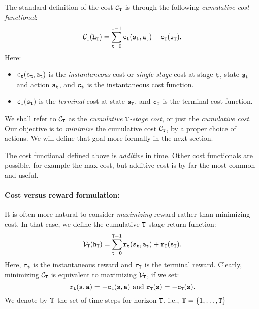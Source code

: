 The standard definition of the cost ${\mathcal{C}_{\tt T}}$ is through
the following \emph{cumulative cost functional}:
\[{\mathcal{C}_{\tt T}}({{\tt h}_{\tt T}}) = \sum_{{\tt t} = 0}^{{\tt T} - 1} {{{\tt c}_{{\tt t}}}({{\tt s}_{{\tt t}}},{{\tt a}_{{\tt t}}}) + {{\tt c}_{\tt T}}({{\tt s}_{\tt T}})}. \]
Here:
    \begin{itemize}
    \item
${{\tt c}_{{\tt t}}}({{\tt s}_{{\tt t}}},{{\tt a}_{{\tt t}}})$ is the
\emph{instantaneous}  cost or \emph{single-stage }cost at stage
${\tt t}$, state ${\tt s}_{\tt t}$ and action ${\tt a}_{\tt t}$, and ${{\tt c}_{{\tt t}}}$ is the instantaneous cost function.
    \item
${{\tt c}_{\tt T}}({{\tt s}_{\tt T}})$ is the \emph{terminal} cost at state ${\tt s}_{\tt T}$,
and ${{\tt c}_{\tt T}}$ is the terminal cost function.
  \end{itemize}


We shall refer to ${\mathcal{C}_{\tt T}}$ as the \emph{cumulative ${\tt T}$-stage cost}, or just the \emph{cumulative cost}.
Our objective is to \emph{minimize} the cumulative cost
${\mathcal{C}_{\tt T}}$, by a proper choice of actions. We will define
that goal more formally in the next section.

\begin{remark}
    The cost functional defined above is \emph{additive} in time. Other cost functionals are possible, for example the max cost, but additive cost is by far the most common and useful.
\end{remark}


\paragraph{Cost versus reward formulation: }
It is often more natural to consider \emph{maximizing} reward rather
than minimizing cost.  In that case, we define the cumulative
${\tt T}$-stage return function:
$${\mathcal{V}_{\tt T}}({{\tt h}_{\tt T}}) = \sum_{{\tt t} = 0}^{{\tt T} - 1} {{{\tt r}_{{\tt t}}}({{\tt s}_{{\tt t}}},{{\tt a}_{{\tt t}}}) + {{\tt r}_{\tt T}}({{\tt s}_{\tt T}})} .$$
Here, ${{\tt r}_{{\tt t}}}$ is the instantaneous reward and
${{\tt r}_{\tt T}}$ is the terminal reward. Clearly, minimizing
${\mathcal{C}_{\tt T}}$ is equivalent to maximizing
${\mathcal{V}_{\tt T}}$, if we set:
$${{\tt r}_{{\tt t}}}({\tt s},{\tt a}) =  - {{\tt c}_{{\tt t}}}({\tt s},{\tt a}) \text{ and }{{\tt r}_{\tt T}}({\tt s}) =  - {{\tt c}_{\tt T}}({\tt s}).$$
We denote by $\mathbb{T}$ the set of time steps for horizon ${\tt T}$, i.e.,
$\mathbb{T}=\{1, \ldots, {\tt T}\}$


